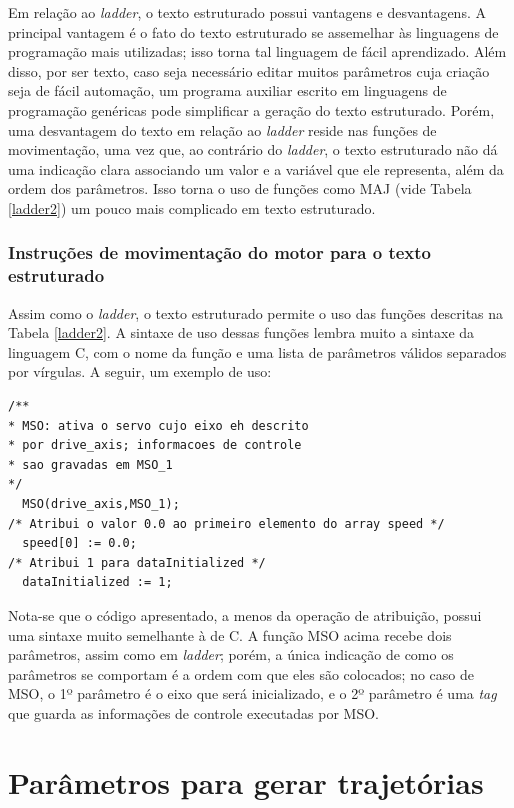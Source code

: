 Em relação ao \textit{ladder}, o texto estruturado possui vantagens e desvantagens. A principal vantagem é o fato do texto estruturado se assemelhar às linguagens de programação mais utilizadas; isso torna tal linguagem de fácil aprendizado. Além disso, por ser texto, caso seja necessário editar muitos parâmetros cuja criação seja de fácil automação, um programa auxiliar escrito em linguagens de programação genéricas pode simplificar a geração do texto estruturado. Porém, uma desvantagem do texto em relação ao \textit{ladder} reside nas funções de movimentação, uma vez que, ao contrário do \textit{ladder}, o texto estruturado não dá uma indicação clara associando um valor e a variável que ele representa, além da ordem dos parâmetros. Isso torna o uso de funções como MAJ (vide Tabela \ref{ladder2}) um pouco mais complicado em texto estruturado.

\subsubsection{Instruções de movimentação do motor para o texto estruturado}
Assim como o \textit{ladder}, o texto estruturado permite o uso das funções descritas na Tabela \ref{ladder2}. A sintaxe de uso dessas funções lembra muito a sintaxe da linguagem C, com o nome da função e uma lista de parâmetros válidos separados por vírgulas. A seguir, um exemplo de uso:
 
\begin{lstlisting}
/**
* MSO: ativa o servo cujo eixo eh descrito
* por drive_axis; informacoes de controle
* sao gravadas em MSO_1
*/
  MSO(drive_axis,MSO_1);
/* Atribui o valor 0.0 ao primeiro elemento do array speed */
  speed[0] := 0.0; 
/* Atribui 1 para dataInitialized */
  dataInitialized := 1;
\end{lstlisting}

Nota-se que o código apresentado, a menos da operação de atribuição, possui uma sintaxe muito semelhante à de C. A função MSO acima recebe dois parâmetros, assim como em \textit{ladder}; porém, a única indicação de como os parâmetros se comportam é a ordem com que eles são colocados; no caso de MSO, o 1º parâmetro é o eixo que será inicializado, e o 2º parâmetro é uma \textit{tag} que guarda as informações de controle executadas por MSO.


\section{Parâmetros para gerar trajetórias}

